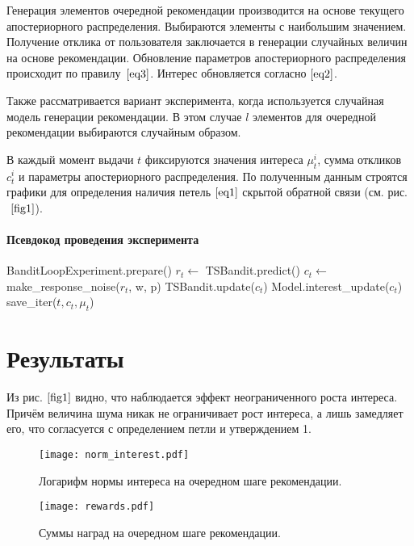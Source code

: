\documentclass[12pt, twoside]{article}
\begin{document}
Генерация элементов очередной рекомендации производится на основе текущего апостериорного распределения. 
Выбираются элементы с наибольшим значением. 
Получение отклика от пользователя заключается в генерации случайных величин на основе рекомендации.
Обновление параметров апостериорного распределения происходит по правилу~$\eqref{eq3}$. 
Интерес обновляется согласно $\eqref{eq2}$.

Также рассматривается вариант эксперимента, когда используется случайная модель генерации рекомендации. 
В этом случае $l$ элементов для очередной рекомендации выбираются случайным образом. 

В каждый момент выдачи $t$ фиксируются значения интереса $\mu_t^i$, сумма откликов $c_t^i$ и параметры апостериорного распределения. 
По полученным данным строятся графики для определения наличия петель $\eqref{eq1}$ скрытой обратной связи (см. рис.$~\ref{fig1}$).

\paragraph{Псевдокод проведения эксперимента}
\begin{algorithmic}
  \STATE BanditLoopExperiment.prepare()
    \STATE $r_t \leftarrow$ TSBandit.predict()
    \STATE $c_t \leftarrow$ make\_response\_noise($r_t$, w, p)
    \STATE TSBandit.update($c_t$)
    \STATE Model.interest\_update($c_t$)
    \STATE save\_iter($t, c_t, \mu_t$)
  \ENDFOR
\end{algorithmic}

\section{Результаты}
Из рис.$~\ref{fig1}$ видно, что наблюдается эффект неограниченного роста интереса. 
Причём величина шума никак не ограничивает рост интереса, а лишь замедляет его, что согласуется с определением петли и утверждением 1. 


\begin{figure}[h]
  \begin{multicols}{2}
    \hfill
    \texttt{[image: norm\_interest.pdf]}
    \hfill
    \caption{Логарифм нормы интереса на очередном шаге рекомендации.}
    \label{fig1}
    \hfill
    \texttt{[image: rewards.pdf]}
    \hfill
    \caption{Суммы наград на очередном шаге рекомендации.}
    \label{fig2}
  \end{multicols}
\end{figure}
\end{document}
